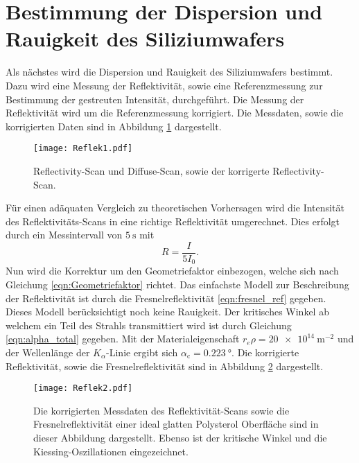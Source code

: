 \section{Bestimmung der Dispersion und Rauigkeit des Siliziumwafers}
\label{sec:dis_rau}
Als nächstes wird die Dispersion und Rauigkeit des Siliziumwafers bestimmt. Dazu wird eine Messung der Reflektivität, sowie eine Referenzmessung zur Bestimmung der gestreuten
Intensität, durchgeführt. Die Messung der Reflektivität wird um die Referenzmessung korrigiert. Die Messdaten, sowie die korrigierten Daten sind in Abbildung \ref{fig:Reflek1}
dargestellt.
\begin{figure}
    \centering
    \texttt{[image: Reflek1.pdf]}
    \caption{Reflectivity-Scan und Diffuse-Scan, sowie der korrigerte Reflectivity-Scan.}
    \label{fig:Reflek1}
\end{figure}

Für einen adäquaten Vergleich zu theoretischen Vorhersagen wird die Intensität des Reflektivitäts-Scans in eine richtige Reflektivität umgerechnet. Dies erfolgt durch ein 
Messintervall von $\qty{5}{\second}$ mit 
\begin{equation*}
    R = \frac{I}{5I_0}.
\end{equation*}
Nun wird die Korrektur um den Geometriefaktor einbezogen, welche sich nach Gleichung \ref{eqn:Geometriefaktor} richtet. Das einfachste Modell zur Beschreibung der 
Reflektivität ist durch die Fresnelreflektivität \ref{eqn:fresnel_ref} gegeben. Dieses Modell berücksichtigt noch keine Rauigkeit. Der kritisches Winkel ab welchem ein Teil des
Strahls transmittiert wird ist durch Gleichung \ref{eqn:alpha_total} gegeben. Mit der Materialeigenschaft $r_e\rho = \qty{20e14}{\metre^{-2}}$ \cite{V44} und der Wellenlänge 
der $K_\alpha$-Linie ergibt sich $\alpha_\text{c} = \qty{0.223}{\degree}$. Die korrigierte Reflektivität, sowie die Fresnelreflektivität sind in Abbildung \ref{fig:Reflek2}
dargestellt.

\begin{figure}
    \centering
    \texttt{[image: Reflek2.pdf]}
    \caption{Die korrigierten Messdaten des Reflektivität-Scans sowie die Fresnelreflektivität einer 
    ideal glatten Polysterol Oberfläche sind in dieser Abbildung dargestellt. Ebenso ist der kritische Winkel und die Kiessing-Oszillationen eingezeichnet.}
    \label{fig:Reflek2}
\end{figure}

